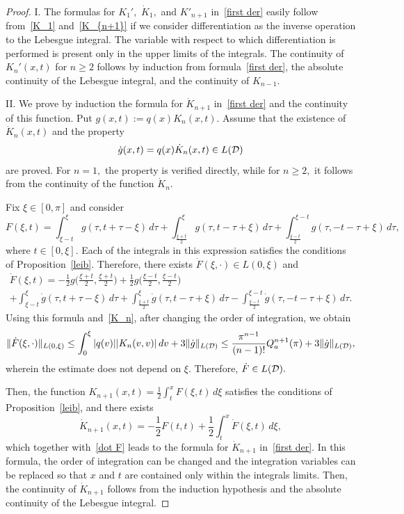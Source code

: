 \documentclass[a4paper, 12pt] {article}
\theoremstyle{plain}
\theoremstyle{remark}
\theoremstyle{plain}
\theoremstyle{definition}
\numberwithin{equation}{section}
\begin{document}
\begin{proof}
I. The formulas for $K_1',$ $\dot K_1,$ and $K'_{n+1}$ in~\eqref{first der} easily follow from~\eqref{K_1} and~\eqref{K_{n+1}} if we consider differentiation as the inverse operation to the Lebesgue integral.
The variable with respect to which differentiation is performed is present only in the upper limits of the integrals.
The continuity of $K_n'(x, t)$ for $n \ge 2$ follows by induction from formula~\eqref{first der}, the absolute continuity of the Lebesgue integral, and  the continuity of $K_{n-1}.$

II. We prove by induction the formula for $\dot K_{n+1}$ in~\eqref{first der} and the continuity of this function.
Put $g(x,t) := q(x)K_n(x, t).$
Assume that the existence of $\dot K_n(x, t)$ and the property
$$ \dot g(x,t) = q(x) \dot K_n(x, t) \in L({\cal D})$$
are proved.
For $n=1,$ the property is verified directly, while for $n \ge 2,$ it follows from the continuity of the function $\dot K_{n}.$

Fix $\xi \in [0, \pi]$ and consider
$$F(\xi, t) = \int_{\xi-t}^\xi g(\tau,t+\tau-\xi)\,d\tau
+\int_{\frac{\xi+t}{2}}^\xi g(\tau,t-\tau+\xi)\,d\tau
+\int_{\frac{\xi-t}{2}}^{\xi-t} g(\tau,-t-\tau+\xi)\,d\tau,$$
where $t \in [0, \xi].$
Each of the integrals in this expression satisfies the conditions of Proposition~\ref{leib}. Therefore, there exists $\dot F(\xi, \cdot) \in L(0, \xi)$ and 
\begin{equation} \label{dot F}
\begin{split}
\dot F(\xi, t) = -\frac12 g\Big(\frac{\xi+t}{2},\frac{\xi+t}{2}\Big)+\frac12g\Big(\frac{\xi-t}{2},\frac{\xi-t}{2}\Big)\\
+\int_{\xi-t}^\xi \dot g(\tau,t+\tau-\xi)\,d\tau
+\int_{\frac{\xi+t}{2}}^\xi \dot g(\tau,t-\tau+\xi)\,d\tau
-\int_{\frac{\xi-t}{2}}^{\xi-t} \dot g(\tau,-t-\tau+\xi)\,d\tau.
\end{split}
\end{equation}
Using this formula and~\eqref{K_n}, after changing the order of integration, we obtain
$$ \|\dot F(\xi, \cdot) \|_{L(0, \xi)} \le \int_0^\xi |q(v)| |K_n(v,v)| \, dv +
3 \| \dot g\|_{L({\cal D})} \le \frac{\pi^{n-1}}{(n-1)!} Q_a^{n+1}(\pi) + 3 \| \dot g\|_{L({\cal D})},$$
wherein the estimate does not depend on $\xi.$ Therefore, $\dot F \in L({\cal D}).$

Then, the function
$K_{n+1}(x, t) = \frac12 \int_t^x F(\xi, t) \, d\xi$ satisfies the conditions of Proposition~\ref{leib}, and there exists
$$\dot K_{n+1}(x, t) = -\frac12F(t, t) + \frac12\int_t^x \dot F(\xi, t) \, d\xi,$$
which together with~\eqref{dot F} leads to the formula for $\dot K_{n+1}$ in~\eqref{first der}.  In this formula, the order of integration can be changed and the integration variables can be replaced so that $x$ and $t$ are contained only within the integrals limits. Then, the continuity of $\dot K_{n+1}$ follows from the induction hypothesis and the absolute continuity of the Lebesgue integral.


\end{proof}
\end{document}
